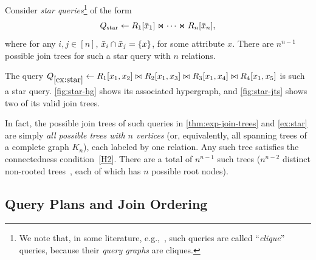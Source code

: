 \begin{theorem}
    \label{thm:exp-join-trees}
    Consider \emph{star queries}\footnote{We note that, in some literature, e.g.,~\cite{birler_optimizing_2025}, such queries are called ``\emph{clique}'' queries, because their \emph{query graphs} are cliques. 
    }
    of the form
    \[
        Q_{\rm star} \gets R_1[\bar{x}_1] \Join \cdots \Join R_n[\bar{x}_n], 
    \]
    where for any $i, j \in [n]$, $\bar{x}_i \cap \bar{x}_j = \lbrace x\rbrace$, for some attribute $x$.  There are $n^{n-1}$ possible join trees for such a star query with $n$ relations. 
\end{theorem}

\begin{example}
    \label{ex:star}
    The query $Q_{\ref{ex:star}} \gets R_1[x_1, x_2] \bowtie R_2[x_1, x_3] \bowtie R_3[x_1, x_4] \bowtie R_4[x_1, x_5]$ is such a star query. \cref{fig:star-hg} shows its associated hypergraph, and \cref{fig:star-jts} shows two of its valid join trees.
    
\end{example}

In fact, the possible join trees of such queries in \cref{thm:exp-join-trees} and \cref{ex:star} are simply \emph{all possible trees with $n$ vertices} (or, equivalently, all spanning trees of a complete graph $K_n$), each labeled by one relation. Any such tree satisfies the connectedness condition~\ref{H2}. 
There are a total of $n^{n-1}$ such trees ($n^{n-2}$ distinct non-rooted trees~\cite{prufer_neuer_1918}, each of which has $n$ possible root nodes).



\subsection{Query Plans and Join Ordering}
\label{sec:prelim-plans}

